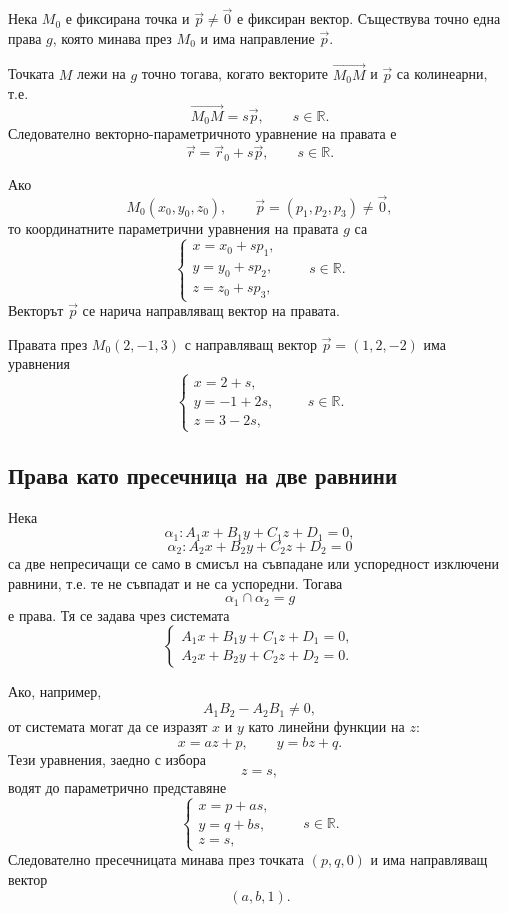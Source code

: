 Нека $M_0$ е фиксирана точка и $\vec p\ne\vec0$ е фиксиран вектор. Съществува точно една права $g$, която минава през $M_0$ и има направление $\vec p$.

Точката $M$ лежи на $g$ точно тогава, когато векторите $\overrightarrow{M_0M}$ и $\vec p$ са колинеарни, т.е.
\[
\overrightarrow{M_0M}=s\vec p,\qquad s\in\mathbb R.
\]
Следователно векторно-параметричното уравнение на правата е
\[
\boxed{\vec r=\vec r_0+s\vec p,\qquad s\in\mathbb R.}
\]

\begin{keydefn}
Ако
\[
M_0(x_0,y_0,z_0),\qquad
\vec p=(p_1,p_2,p_3)\ne\vec0,
\]
то координатните параметрични уравнения на правата $g$ са
\[
\boxed{
\begin{cases}
x=x_0+sp_1,\\
y=y_0+sp_2,\\
z=z_0+sp_3,
\end{cases}
\qquad s\in\mathbb R.}
\]
Векторът $\vec p$ се нарича направляващ вектор на правата.
\end{keydefn}

\begin{example}
Правата през $M_0(2,-1,3)$ с направляващ вектор $\vec p=(1,2,-2)$ има уравнения
\[
\begin{cases}
x=2+s,\\
y=-1+2s,\\
z=3-2s,
\end{cases}
\qquad s\in\mathbb R.
\]
\end{example}

\subsection{Права като пресечница на две равнини}\label{s:29.6.2}

Нека
\[
\alpha_1:A_1x+B_1y+C_1z+D_1=0,
\]
\[
\alpha_2:A_2x+B_2y+C_2z+D_2=0
\]
са две непресичащи се само в смисъл на съвпадане или успоредност изключени равнини, т.е. те не съвпадат и не са успоредни. Тогава
\[
\alpha_1\cap\alpha_2=g
\]
е права. Тя се задава чрез системата
\[
\boxed{
\begin{cases}
A_1x+B_1y+C_1z+D_1=0,\\
A_2x+B_2y+C_2z+D_2=0.
\end{cases}}
\]

Ако, например,
\[
A_1B_2-A_2B_1\ne0,
\]
от системата могат да се изразят $x$ и $y$ като линейни функции на $z$:
\[
x=az+p,\qquad y=bz+q.
\]
Тези уравнения, заедно с избора
\[
z=s,
\]
водят до параметрично представяне
\[
\begin{cases}
x=p+as,\\
y=q+bs,\\
z=s,
\end{cases}
\qquad s\in\mathbb R.
\]
Следователно пресечницата минава през точката $(p,q,0)$ и има направляващ вектор
\[
(a,b,1).
\]

